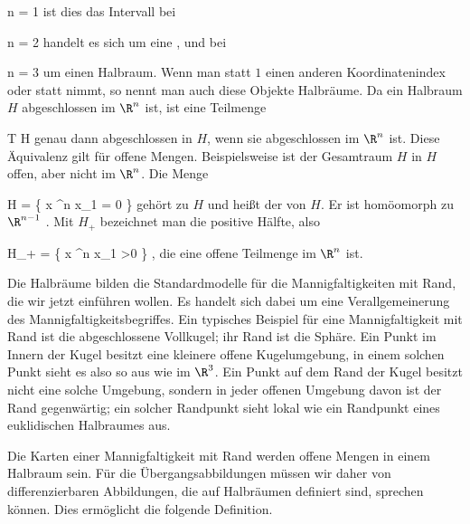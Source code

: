\mavergleichskette
{\vergleichskette
{ n
}
{ = }{ 1
}
{  }{
}
{    }{
}
{   }{
}
}
{}{}{}
ist dies das Intervall
\mathl{[0, \infty]}{,} bei

\mavergleichskette
{\vergleichskette
{ n
}
{ = }{ 2
}
{  }{
}
{    }{
}
{   }{
}
}
{}{}{}
handelt es sich um eine  {,} und bei

\mavergleichskette
{\vergleichskette
{ n
}
{ = }{ 3
}
{  }{
}
{    }{
}
{   }{
}
}
{}{}{}
um einen Halbraum. Wenn man statt $1$ einen anderen Koordinatenindex oder \anfuehrung{$\leq$}{} statt \anfuehrung{$\geq$ }{} nimmt, so nennt man auch diese Objekte Halbräume. Da ein Halbraum $H$ abgeschlossen im $\R^n$ ist, ist eine Teilmenge

\mavergleichskette
{\vergleichskette
{ T
}
{ \subseteq }{ H
}
{  }{
}
{    }{
}
{   }{
}
}
{}{}{}
genau dann abgeschlossen in $H$, wenn sie abgeschlossen im $\R^n$ ist. Diese Äquivalenz gilt
 für offene Mengen. Beispielsweise ist der Gesamtraum $H$ in $H$ offen, aber nicht im $\R^n$. Die Menge

\mavergleichskettedisp
{\vergleichskette
{ \partial H
}
{ =} { \left\{  x \in \R^n   \mid   x_1 = 0        \right\}
}
{ } {
}
{ } {
}
{ } {
}
}
{}{}{}
gehört zu $H$ und heißt der  {} von $H$. Er ist homöomorph zu $\R^{n-1}$
 {} {.}
Mit $H_+$ bezeichnet man die positive Hälfte, also

\mavergleichskette
{\vergleichskette
{ H_+
}
{ = }{ \left\{  x \in \R^n   \mid   x_1 >0        \right\}
}
{  }{
}
{    }{
}
{   }{
}
}
{}{}{,}
die eine offene Teilmenge im $\R^n$ ist.

Die Halbräume bilden die Standardmodelle für die Mannigfaltigkeiten mit Rand, die wir jetzt einführen wollen. Es handelt sich dabei um eine Verallgemeinerung des Mannigfaltigkeitsbegriffes. Ein typisches Beispiel für eine Mannigfaltigkeit mit Rand ist die abgeschlossene Vollkugel; ihr Rand ist die Sphäre. Ein Punkt im Innern der Kugel besitzt eine kleinere offene Kugelumgebung, in einem solchen Punkt sieht es also  so aus wie im $\R^3$. Ein Punkt auf dem Rand der Kugel besitzt nicht eine solche Umgebung, sondern in jeder offenen Umgebung davon ist der Rand gegenwärtig; ein solcher Randpunkt sieht lokal wie ein Randpunkt eines euklidischen Halbraumes aus.

Die Karten einer Mannigfaltigkeit mit Rand werden offene Mengen in einem Halbraum sein. Für die Übergangsabbildungen müssen wir daher von differenzierbaren Abbildungen, die auf Halbräumen definiert sind, sprechen können. Dies ermöglicht die folgende Definition.

